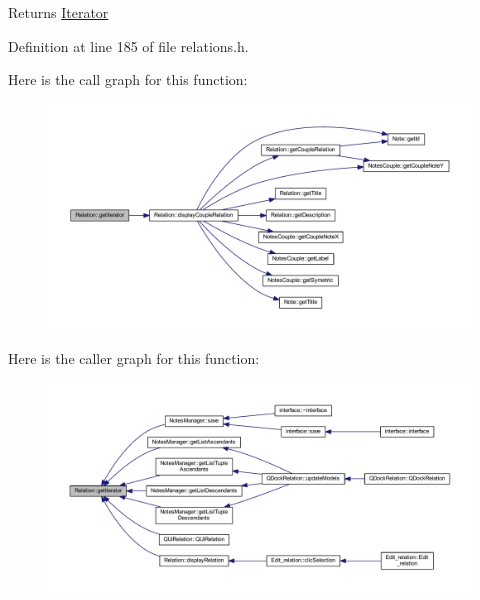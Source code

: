 \begin{DoxyReturn}{Returns}
\hyperlink{class_relation_1_1_iterator}{Iterator} 
\end{DoxyReturn}


Definition at line 185 of file relations.\+h.

Here is the call graph for this function\+:\nopagebreak
\begin{figure}[H]
\begin{center}
\leavevmode
\includegraphics[width=350pt]{class_relation_aedcb559cf6471c8eb731026e45fd00a0_cgraph}
\end{center}
\end{figure}
Here is the caller graph for this function\+:\nopagebreak
\begin{figure}[H]
\begin{center}
\leavevmode
\includegraphics[width=350pt]{class_relation_aedcb559cf6471c8eb731026e45fd00a0_icgraph}
\end{center}
\end{figure}
\mbox{\label{class_relation_a69211cc18aed20c1df97c4b73317a2e1}} 
